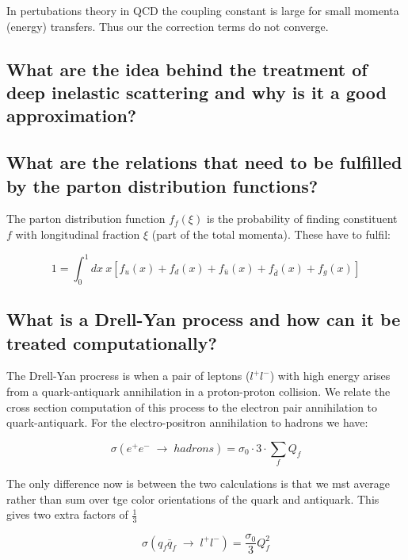 \documentclass[paper=a4, fontsize=11pt]{scrartcl} %
\numberwithin{equation}{section} %
\numberwithin{figure}{section} %
\numberwithin{table}{section} %
\begin{document}
In pertubations theory in QCD the coupling constant is large for small momenta (energy) transfers. Thus our the correction terms do not converge.

\subsection{What are the idea behind the treatment of deep inelastic scattering and why is it a good approximation?}



\subsection{What are the relations that need to be fulfilled by the parton distribution functions?}

The parton distribution function $f_f(\xi)$ is the probability of finding constituent $f$ with longitudinal fraction $\xi$ (part of the total momenta). These have to fulfil:

\begin{equation}
1 = \int_0^1dx~x\left[ f_u(x) + f_d(x) + f_{\bar{u}}(x) + f_{\bar{d}}(x) + f_g(x)\right]
\end{equation}



\subsection{What is a Drell-Yan process and how can it be treated computationally?}

The Drell-Yan procress is when a pair of leptons ($l^+l^-$) with high energy arises from a quark-antiquark annihilation in a proton-proton collision. We relate the cross section computation of this process to the electron pair annihilation to quark-antiquark. For the electro-positron annihilation to hadrons we have:

\begin{equation}
\sigma(e^+e^-\; \rightarrow \; hadrons) = \sigma_0\cdot3\cdot\sum_fQ_f
\end{equation}

The only difference now is between the two calculations is that we mst average rather than sum over tge color orientations of the quark and antiquark. This gives two extra factors of $\frac{1}{3}$

\begin{equation}
\sigma(q_f\bar{q}_f \; \rightarrow \; l^+l^-) = \frac{\sigma_0}{3}Q_f^2
\end{equation}
\end{document}

